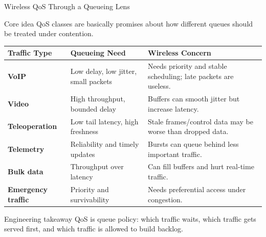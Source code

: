 \documentclass[aspectratio=169]{beamer}
\begin{document}
\begin{frame}{Wireless QoS Through a Queueing Lens}
\tiny

\begin{block}{Core idea}
QoS classes are basically promises about how different queues should be treated under contention.
\end{block}

\vspace{0.15cm}

\begin{tabular}{p{2.4cm} p{4.0cm} p{5.8cm}}
\toprule
\textbf{Traffic Type} & \textbf{Queueing Need} & \textbf{Wireless Concern} \\
\midrule
\textbf{VoIP} & Low delay, low jitter, small packets & Needs priority and stable scheduling; late packets are useless. \\
\textbf{Video} & High throughput, bounded delay & Buffers can smooth jitter but increase latency. \\
\textbf{Teleoperation} & Low tail latency, high freshness & Stale frames/control data may be worse than dropped data. \\
\textbf{Telemetry} & Reliability and timely updates & Bursts can queue behind less important traffic. \\
\textbf{Bulk data} & Throughput over latency & Can fill buffers and hurt real-time traffic. \\
\textbf{Emergency traffic} & Priority and survivability & Needs preferential access under congestion. \\
\bottomrule
\end{tabular}

\vspace{0.15cm}

\begin{alertblock}{Engineering takeaway}
QoS is queue policy: which traffic waits, which traffic gets served first, and which traffic is allowed to build backlog.
\end{alertblock}

\end{frame}
\end{document}
